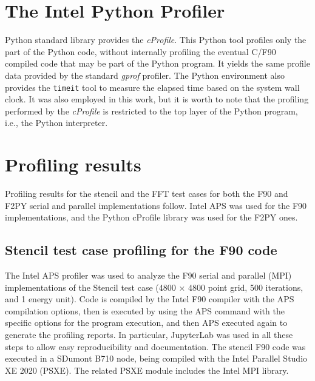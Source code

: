 %
%
%
\section{The Intel Python Profiler}

Python standard library provides the \textit {cProfile}. This Python tool profiles only the part of the Python code, without internally profiling the eventual C/F90 compiled code that may be part of the Python program. It yields the same profile data provided by the standard \textit {gprof} profiler. The Python environment also provides the \texttt {timeit} tool to measure the elapsed time based on the system wall clock. It was also employed in this work, but it is worth to note that the profiling performed by the \textit {cProfile} is restricted to the top layer of the Python program, i.e., the Python interpreter.

%
%
%
\section{Profiling results}
\label{sec_analprof}

Profiling results for the stencil and the FFT test cases for both the F90 and F2PY serial and parallel implementations follow. Intel APS was used for the F90 implementations, and the Python cProfile library was used for the F2PY ones. 

%
%
%
\subsection{Stencil test case profiling for the F90 code}
\label{sec_analprofsten}

The Intel APS profiler was used to analyze the F90 serial and parallel (MPI) implementations of the Stencil test case (4800 × 4800 point grid, 500 iterations, and 1 energy unit). Code is compiled by the Intel F90 compiler with the APS compilation options, then is executed by using the APS command with the specific options for the program execution, and then APS executed again to generate the profiling reports. In particular, JupyterLab was used in all these steps to allow easy reproducibility and documentation. The stencil F90 code was executed in a SDumont B710 node, being compiled with the Intel Parallel Studio XE 2020 (PSXE). The related PSXE module includes the Intel MPI library.

